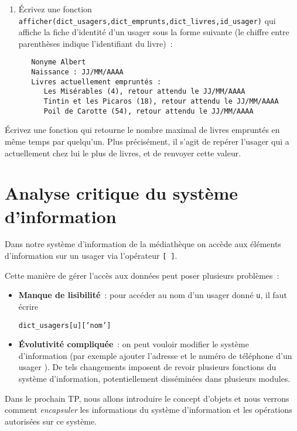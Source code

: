 \documentclass[10pt,a4paper]{sujets-exercices}
\begin{document}
\begin{enumerate}
\item Écrivez une fonction \texttt{afficher(dict\_usagers,dict\_emprunts,dict\_livres,id\_usager)} qui affiche la fiche d'identité d'un usager sous la forme suivante (le chiffre entre parenthèses indique l'identifiant du livre)~:\\
\begin{verbatim}
   Nonyme Albert
   Naissance : JJ/MM/AAAA
   Livres actuellement empruntés :
      Les Misérables (4), retour attendu le JJ/MM/AAAA
      Tintin et les Picaros (18), retour attendu le JJ/MM/AAAA
      Poil de Carotte (54), retour attendu le JJ/MM/AAAA
\end{verbatim}

\end{enumerate}


Écrivez une fonction qui retourne le nombre maximal de livres empruntés en même temps par quelqu'un. Plus précisément, il s'agit de repérer l'usager qui a actuellement chez lui le plus de livres, et de renvoyer cette valeur.


\section{Analyse critique du système d'information}

Dans notre système d'information de la médiathèque on accède aux éléments d'information sur un usager via l'opérateur \verb![ ]!. 

Cette manière de gérer l'accès aux données peut poser plusieurs problèmes~:

\begin{itemize}
\item \textbf{Manque de lisibilité}~: pour accéder au nom d'un usager donné \texttt{u}, il faut écrire 
\begin{center}

	\texttt{dict\_usagers[u]['nom']}
\end{center}
\item \textbf{Évolutivité compliquée}~: on peut vouloir modifier le système d'information (par exemple ajouter l'adresse et le numéro de téléphone d'un usager ). De tels changements imposent de revoir plusieurs fonctions du système d'information, potentiellement disséminées dans plusieurs modules.
\end{itemize}

Dans le prochain TP, nous allons introduire le concept d'objets et nous verrons comment \emph{encapsuler} les informations du système d'information et les opérations autorisées sur ce système.
\end{document}
